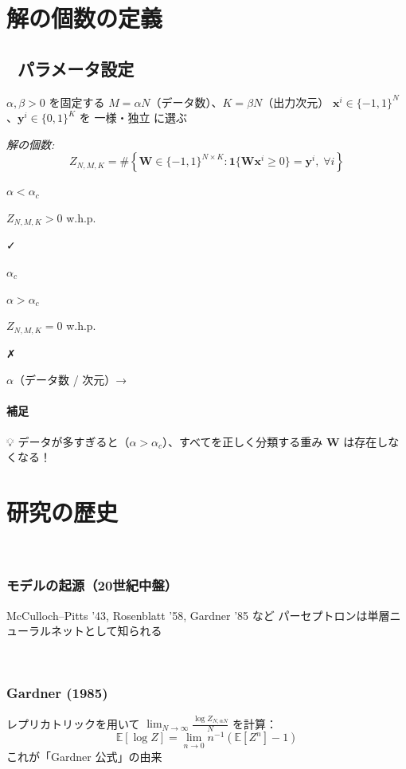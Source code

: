 \documentclass[uplatex,dvipdfmx,11pt,a4paper,openany]{bxjsbook}
\begin{document}
\section{解の個数の定義}
\subsection{📐 パラメータ設定}
\( \alpha, \beta > 0 \) を固定する\allowbreak{} 
                \( M = \alpha N \)（データ数）、\( K = \beta N \)（出力次元）\allowbreak{} 
                \( \mathbf{x}^i \in \{-1,1\}^N \)、\( \mathbf{y}^i \in \{0,1\}^K \) を 一様・独立 に選ぶ

\emph{解の個数:}\allowbreak{} 
\[ Z_{N,M,K} = \#\left\{ \mathbf{W} \in \{-1, 1\}^{N \times K} : \mathbf{1}\{ \mathbf{W}\mathbf{x}^i \ge 0 \} = \mathbf{y}^i, \; \forall i \right\} \]

\( \alpha < \alpha_c \)

\( Z_{N,M,K} > 0 \) w.h.p.

✓

\( \alpha_c \)

\( \alpha > \alpha_c \)

\( Z_{N,M,K} = 0 \) w.h.p.

✗

\( \alpha \)（データ数 / 次元）→

\paragraph{補足}
💡 データが多すぎると（\( \alpha > \alpha_c \)）、すべてを正しく分類する重み \( \mathbf{W} \) は存在しなくなる！


\section{研究の歴史}
🔬

\subsubsection{モデルの起源（20世紀中盤）}
McCulloch–Pitts '43, Rosenblatt '58, Gardner '85 など\allowbreak{} 
                    パーセプトロンは単層ニューラルネットとして知られる

🎲

\subsubsection{Gardner (1985)}
レプリカトリックを用いて \( \displaystyle\lim_{N\to \infty} \frac{\log{Z_{N,\alpha N}}}{N} \) を計算：
                    \[ \mathbb{E}[\log{Z}]=\lim_{n\to 0} n^{-1} (\mathbb{E}[Z^n]-1) \]
                    これが「Gardner 公式」の由来
\end{document}
